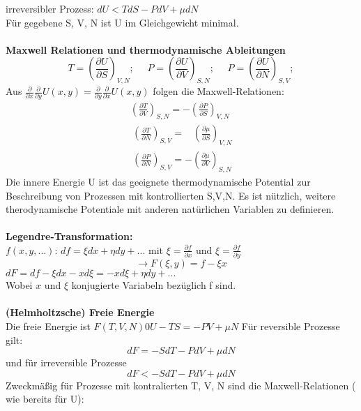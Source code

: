 \documentclass[a4paper,11pt]{scrartcl}
\begin{document}
irreversibler Prozess: $ dU < TdS - PdV + \mu dN $\\
Für gegebene S, V, N ist U im Gleichgewicht minimal.\\
\\
\textbf{Maxwell Relationen und thermodynamische Ableitungen}\\
\begin{equation}
 T = \left( \frac{\partial U }{\partial S}\right)_ {V,N}; \, \, \, \,\, \, \, \,  P = \left( \frac{\partial U }{\partial V}\right)_ {S,N}; \,\,\,\,\,\,\,\, P = \left( \frac{\partial U }{\partial N}\right)_ {S,V};
\end{equation}
Aus $\frac{\partial }{\partial x} \frac{\partial }{\partial y} U(x,y) = \frac{\partial }{\partial y} \frac{\partial }{\partial x} U(x,y)$ folgen die Maxwell-Relationen:
\begin{equation}
  \begin{split}
 \left(\frac{\partial T}{\partial V} \right)_{S,N} = -\left(\frac{\partial P}{\partial S} \right)_{V,N} \\\
 \left(\frac{\partial T}{\partial N} \right)_{S,V} = \,\, \,\, \, \left(\frac{\partial \mu}{\partial S} \right)_{V,N} \\\
 \left(\frac{\partial P}{\partial N} \right)_{S,V} = -\left(\frac{\partial \mu}{\partial V} \right)_{S,N}
  \end{split}
\end{equation}
Die innere Energie U ist das geeignete thermodynamische Potential zur Beschreibung von Prozessen mit kontrollierten S,V,N. Es ist nützlich, weitere therodynamische Potentiale mit anderen natürlichen Variablen zu definieren.\\
\\
\textbf{Legendre-Transformation:}\\
$f(x, y, ...)$: $df = \xi dx +\eta dy + ...$ mit $\xi = \frac{\partial f}{\partial x}$ und $\xi = \frac{\partial f}{\partial y}$
$$\rightarrow F(\xi,y) = f- \xi x$$
$dF = df- \xi dx - x d\xi = -x d \xi + \eta dy+ ...$\\
Wobei $x$ und $\xi$ konjugierte Variabeln bezüglich f sind.\\
\\
\textbf{(Helmholtzsche) Freie Energie}\\
Die freie Energie ist $F(T,V,N) 0 U-TS = -PV + \mu N$ Für reversible Prozesse gilt:  $$d F = -SdT - PdV + \mu dN$$ und für irreversible Prozesse
$$ d F < -SdT - PdV + \mu dN$$ Zweckmäßig für Prozesse mit kontralierten T, V, N sind die Maxwell-Relationen ( wie bereits für U): 
\end{document}
